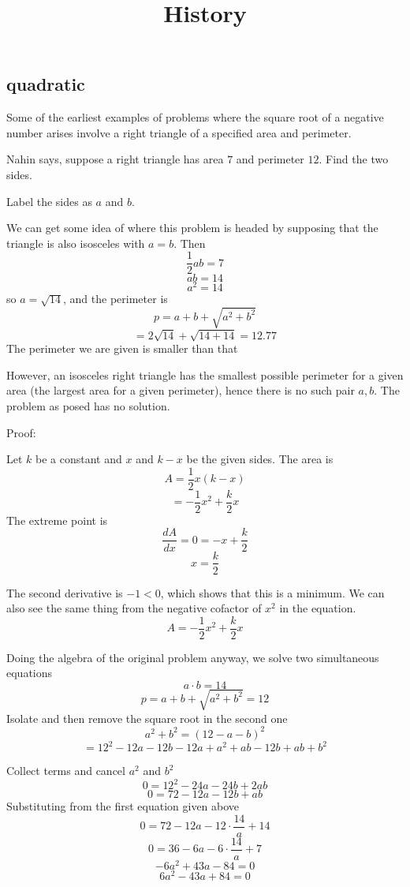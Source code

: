 \documentclass[11pt, oneside]{article}
\title{History}
\date{}
\begin{document}
\maketitle
\Large

\subsection*{quadratic}

Some of the earliest examples of problems where the square root of a negative number arises involve a right triangle of a specified area and perimeter.  

Nahin says, suppose a right triangle has area $7$ and perimeter $12$.  Find the two sides.  

Label the sides as $a$ and $b$.

We can get some idea of where this problem is headed by supposing that the triangle is also isosceles with $a = b$.  Then 
\[ \frac{1}{2} ab = 7 \]
\[ ab = 14 \]
\[ a^2 = 14 \] 
so $a = \sqrt{14}$, and the perimeter is
\[ p = a + b + \sqrt{a^2 + b^2} \]
\[ = 2 \sqrt{14} + \sqrt{14 + 14} = 12.77 \]
The perimeter we are given is smaller than that

However, an isosceles right triangle has the smallest possible perimeter for a given area (the largest area for a given perimeter), hence there is no such pair $a,b$.
The problem as posed has no solution.

Proof:

Let $k$ be a constant and $x$ and $k - x$ be the given sides.  The area is
\[ A = \frac{1}{2} x (k - x) \]
\[ = -\frac{1}{2} x^2 + \frac{k}{2} x \]
The extreme point is
\[ \frac{dA}{dx} = 0 = - x + \frac{k}{2} \]
\[ x = \frac{k}{2} \]

The second derivative is $-1 < 0$, which shows that this is a minimum.  We can also see the same thing from the negative cofactor of $x^2$ in the equation.
\[ A = -\frac{1}{2} x^2 + \frac{k}{2} x \]

Doing the algebra of the original problem anyway, we solve two simultaneous equations
\[ a \cdot b = 14 \]
\[ p = a + b + \sqrt{a^2 + b^2} = 12 \]
Isolate and then remove the square root in the second one
\[ a^2 + b^2 = (12 - a - b)^2 \]
\[ = 12^2 - 12a - 12b - 12a + a^2 + ab - 12b + ab + b^2 \]

Collect terms and cancel $a^2$ and $b^2$
\[ 0 = 12^2 - 24a - 24b + 2ab \]
\[ 0 = 72 - 12a - 12b + ab \]
Substituting from the first equation given above
\[ 0 = 72 - 12a - 12 \cdot \frac{14}{a} + 14 \]
\[ 0 = 36 - 6a - 6 \cdot \frac{14}{a} + 7 \]
\[ -6 a^2 + 43a - 84 = 0 \]
\[ 6 a^2 - 43a + 84 = 0 \]
\end{document}
